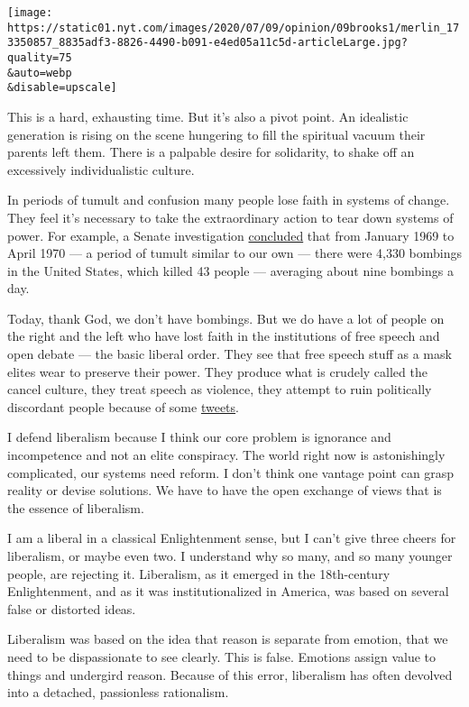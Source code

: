 \texttt{[image: https://static01.nyt.com/images/2020/07/09/opinion/09brooks1/merlin\_173350857\_8835adf3-8826-4490-b091-e4ed05a11c5d-articleLarge.jpg?quality=75\\\&auto=webp\\\&disable=upscale]}

This is a hard, exhausting time. But it's also a pivot point. An
idealistic generation is rising on the scene hungering to fill the
spiritual vacuum their parents left them. There is a palpable desire for
solidarity, to shake off an excessively individualistic culture.

In periods of tumult and confusion many people lose faith in systems of
change. They feel it's necessary to take the extraordinary action to
tear down systems of power. For example, a Senate investigation
\href{https://cityroom.blogs.nytimes.com/2009/08/27/1969-a-year-of-bombings/}{concluded}
that from January 1969 to April 1970 --- a period of tumult similar to
our own --- there were 4,330 bombings in the United States, which killed
43 people --- averaging about nine bombings a day.

Today, thank God, we don't have bombings. But we do have a lot of people
on the right and the left who have lost faith in the institutions of
free speech and open debate --- the basic liberal order. They see that
free speech stuff as a mask elites wear to preserve their power. They
produce what is crudely called the cancel culture, they treat speech as
violence, they attempt to ruin politically discordant people because of
some
\href{https://twitter.com/sapinker/status/1279934082210816003?s=20}{tweets}.

I defend liberalism because I think our core problem is ignorance and
incompetence and not an elite conspiracy. The world right now is
astonishingly complicated, our systems need reform. I don't think one
vantage point can grasp reality or devise solutions. We have to have the
open exchange of views that is the essence of liberalism.

I am a liberal in a classical Enlightenment sense, but I can't give
three cheers for liberalism, or maybe even two. I understand why so
many, and so many younger people, are rejecting it. Liberalism, as it
emerged in the 18th-century Enlightenment, and as it was
institutionalized in America, was based on several false or distorted
ideas.

Liberalism was based on the idea that reason is separate from emotion,
that we need to be dispassionate to see clearly. This is false. Emotions
assign value to things and undergird reason. Because of this error,
liberalism has often devolved into a detached, passionless rationalism.

